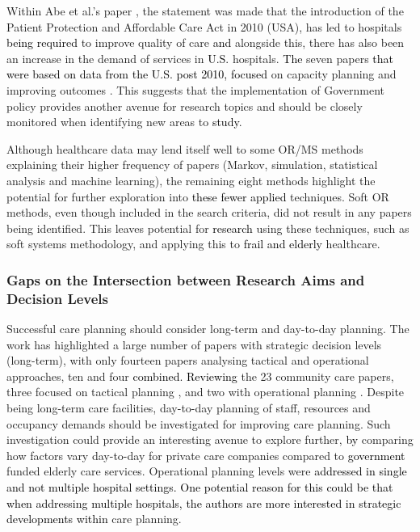 \documentclass[../thesis.tex]{subfiles}
\begin{document}
 Within Abe et al.’s paper \cite{Abe2}, the statement was made that the introduction of the Patient Protection and Affordable Care Act in 2010 (USA), has led to hospitals \textcolor{black}{being required} to improve quality of care \textcolor{black}{and} alongside this, there has also been an increase in the demand of services in \textcolor{black}{U.S.} hospitals. \textcolor{black}{The} seven papers \textcolor{black}{that were based on data from the \textcolor{black}{U.S.} post 2010, focused} on capacity planning and improving outcomes \cite{Arling,Bae, Gassoumis,Guo,YLi, Wallace, Zychlinski}. This suggests that the implementation of Government policy provides another avenue for research topics and should be closely monitored when identifying new areas to \textcolor{black}{study}.
 
 Although healthcare data may lend itself well to some OR/MS methods explaining their higher frequency of papers (Markov, simulation, statistical analysis and machine learning), the remaining eight methods highlight the potential for further exploration into \textcolor{black}{these fewer applied} techniques. Soft OR methods, even though included in the search criteria, did not result in any papers being identified. This leaves potential for \textcolor{black}{research} using these techniques, such as soft systems methodology, and applying this to \textcolor{black}{frail and elderly} healthcare.
 
\subsubsection{Gaps on the Intersection between Research Aims and Decision Levels}
Successful care planning should consider long-term and day\textcolor{black}{-}to\textcolor{black}{-}day planning. The work has highlighted a large number of papers with strategic decision levels (long-term), with only fourteen papers analysing tactical and operational approaches, ten and four \textcolor{black}{combined. Reviewing} the 23 community care papers, three focused on tactical planning \cite{Borowiak, Eggink, Yalcindag}, and two with operational planning \cite{Eveborn, Grenouilleau}. Despite being long-term care facilities, day\textcolor{black}{-}to\textcolor{black}{-}day planning of staff, resources and occupancy demands should be investigated for improving care planning. Such investigation could provide an interesting avenue to explore further, \textcolor{black}{by} comparing how factors vary day\textcolor{black}{-}to\textcolor{black}{-}day for private care companies compared to \textcolor{black}{government} funded elderly care services. Operational planning levels were \textcolor{black}{addressed in single and not multiple hospital settings. One potential reason for this could be that when addressing multiple hospitals, the authors are more interested in strategic developments within} care planning.
\end{document}
